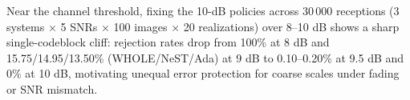 Near the channel threshold, fixing the 10-dB policies across 30\,000 receptions (3 systems $\times$ 5 SNRs $\times$ 100 images $\times$ 20 realizations) over 8--10 dB shows a sharp single-codeblock cliff: rejection rates drop from 100\% at 8 dB and 15.75/14.95/13.50\% (WHOLE/NeST/Ada) at 9 dB to 0.10--0.20\% at 9.5 dB and 0\% at 10 dB, motivating unequal error protection for coarse scales under fading or SNR mismatch.
